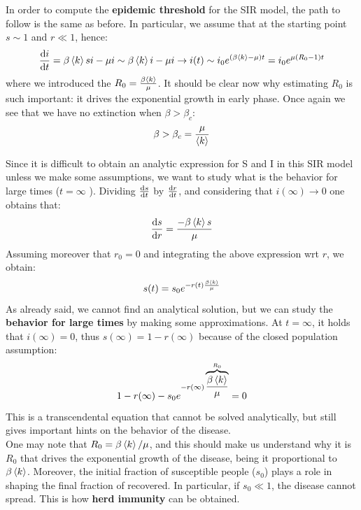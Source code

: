 \documentclass[../main/main.tex]{subfiles}
\begin{document}
In order to compute the \textbf{epidemic threshold} for the SIR model, the path to follow is the same as before. In particular, we assume that at the starting point $s\sim 1$ and $ r \ll 1 $, hence:
\begin{equation*}
  \dv{i}{t} = \beta \expval{k} s i - \mu i \sim \beta \expval{k} i - \mu i \rightarrow i(t) \sim i_0 e^{(\beta \expval{k} - \mu  )t} = i_0 e^{\mu (R_0 - 1)t}
\end{equation*}
where we introduced the $R_0 =\frac{\beta \expval{k}}{\mu} $. It should be clear now why estimating $R_0$ is such important: it drives the exponential growth in early phase. Once again we see that we have no extinction when $\beta > \beta_c$:
\begin{equation}
  \beta > \beta _c = \frac{\mu }{\expval{k} }
\end{equation}

Since it is difficult to obtain an analytic expression for S and I in this SIR model unless we make some assumptions, we want to study what is the behavior for large times ($ t = \infty$ ). Dividing $\dv{s}{t}$ by $\dv{r}{t}$, and considering that $i(\infty) \to 0$ one obtains that:
\begin{equation*}
  \dv{s}{r} = \frac{- \beta  \expval{k}  s}{\mu }
\end{equation*}
Assuming moreover that \( r_0 = 0  \) and integrating the above expression wrt \( r \), we obtain:
\begin{equation*}
  s(t) = s_0 e^{-r(t) \frac{\beta \expval{k} }{\mu }}
\end{equation*}
As already said, we cannot find an analytical solution, but we can study the \textbf{behavior for large times} by making some approximations. At \( t=\infty  \), it holds that \( i (\infty ) = 0 \), thus \( s(\infty ) = 1 - r(\infty ) \) because of the closed population assumption:
\begin{equation*}
  1 - r(\infty ) - s_0 e^{-r(\infty ) \overbrace{\frac{\beta \expval{k} }{\mu }}^{R_0}} = 0
\end{equation*}
This is a transcendental equation that cannot be solved analytically, but still gives important hints on the behavior of the disease.\\
One may note that \( R_0 = \beta \expval{k} / \mu   \), and this should make us understand why it is \( R_0 \) that drives the exponential growth of the disease, being it proportional to $\beta \expval{k}$. Moreover, the initial fraction of susceptible people ($s_0$) plays a role in shaping the final fraction of recovered. In particular, if \( s_0 \ll 1 \), the disease cannot spread. This is how \textbf{herd immunity} can be obtained.
\end{document}
